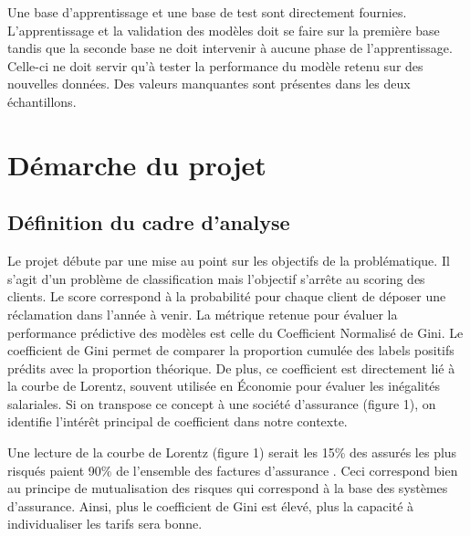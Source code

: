 \documentclass[french]{article}
\begin{document}
\begin{multicols}{2}
Une base d'apprentissage et une base de test sont directement fournies. L'apprentissage et la validation des modèles doit se faire sur la première base tandis que la seconde base ne doit intervenir à aucune phase de l'apprentissage. Celle-ci ne doit servir qu'à tester la performance du modèle retenu sur des nouvelles données. Des valeurs manquantes sont présentes dans les deux échantillons.

\section{Démarche du projet}

\subsection{Définition du cadre d'analyse}

Le projet débute par une mise au point sur les objectifs de la problématique. Il s'agit d'un problème de classification mais l'objectif s'arrête au scoring des clients. Le score correspond à la probabilité pour chaque client de déposer une réclamation dans l'année à venir. La métrique retenue pour évaluer la performance prédictive des modèles est celle du Coefficient Normalisé de Gini. Le coefficient de Gini permet de comparer la proportion cumulée des labels positifs prédits avec la proportion théorique. De plus, ce coefficient est directement lié à la courbe de Lorentz, souvent utilisée en Économie pour évaluer les inégalités salariales. Si on transpose ce concept à une société d'assurance (figure 1), on identifie l'intérêt principal de coefficient dans notre contexte.

Une lecture de la courbe de Lorentz (figure 1) serait \og les 15\% des assurés les plus risqués paient 90\% de l'ensemble des factures d'assurance \fg{}. Ceci correspond bien au principe de mutualisation des risques qui correspond à la base des systèmes d'assurance. Ainsi, plus le coefficient de Gini est élevé, plus la capacité à individualiser les tarifs sera bonne.


\end{multicols}
\end{document}
